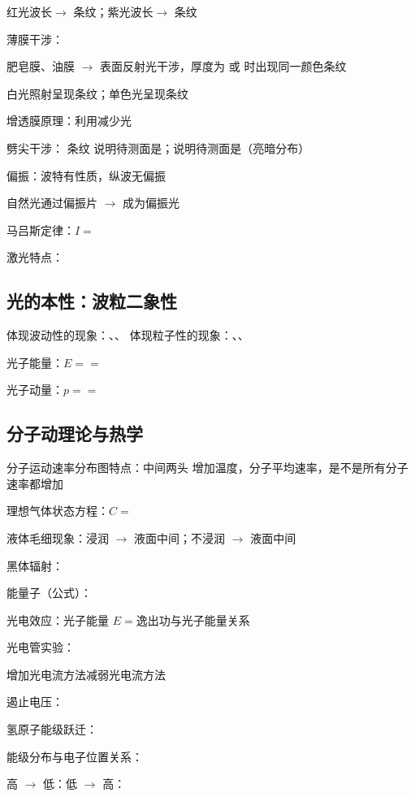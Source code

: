 红光波长\sbl $\rightarrow$ 条纹\sbl ；紫光波长\sbl $\rightarrow$ 条纹\sbl

薄膜干涉：

肥皂膜、油膜 $\rightarrow$ \sbl 表面反射光干涉，厚度为 \sbl 或 \sbl 时出现同一颜色条纹

白光照射呈现\sbl 条纹；单色光呈现\mbl 条纹

增透膜原理：利用\mbl 减少\sbl 光

劈尖干涉：
条纹 \mbl 说明待测面是\sbl ；\mbl 说明待测面是\sbl （亮暗\sbl 分布）

偏振：\sbl 波特有性质，纵波无偏振

自然光通过偏振片 $\rightarrow$ 成为\sbl 偏振光

马吕斯定律：$I =$\mbl

激光特点：

\subsection{光的本性：波粒二象性}

体现波动性的现象：\sbl 、\sbl 、\sbl
体现粒子性的现象：\sbl 、\sbl 、\sbl

光子能量：$E =$\sbl $=$\sbl

光子动量：$p =$\sbl $=$\sbl


\subsection{分子动理论与热学}

分子运动速率分布图特点：中间\sbl 两头\sbl
增加温度，分子平均速率\sbl ，是不是所有分子速率都增加\cmb

理想气体状态方程：$C =$\sbl

液体毛细现象：浸润 $\rightarrow$ 液面中间\sbl ；不浸润 $\rightarrow$ 液面中间\sbl

黑体辐射：

能量子（公式\clb）：

光电效应：\quad 光子能量 $E =$\sbl\quad 逸出功与光子能量关系\clb

光电管实验：

增加光电流方法\cxlb \quad 减弱光电流方法 \cxlb

遏止电压：

氢原子能级跃迁：

能级分布与电子位置关系：

高 $\rightarrow$ 低：\lbl \quad 低 $\rightarrow$ 高：\lbl

